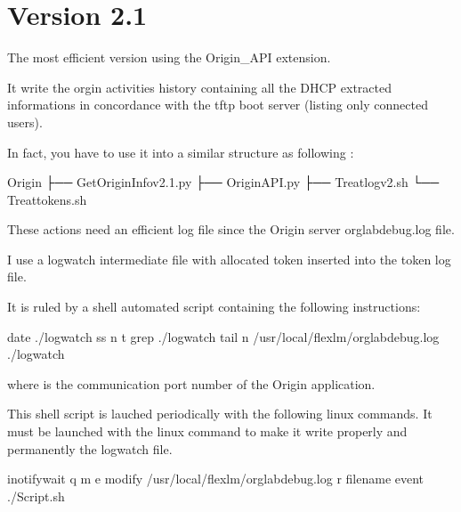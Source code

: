 \documentclass[letterpaper,10pt,english]{sphinxmanual}
\begin{document}
\newpage
\section{Version 2.1}
\label{\detokenize{Get_Origin_Info:version-2-1}}
\sphinxAtStartPar
The most efficient version using the Origin\_API extension.

\sphinxAtStartPar
It write the orgin activities history containing all the DHCP extracted informations in concordance with the tftp boot server (listing only  connected users).

\sphinxAtStartPar
In fact, you have to use it into a similar structure as following :

\begin{sphinxVerbatim}[commandchars=\\\{\}]
Origin
├── Get\PYGZus{}Origin\PYGZus{}Info\PYGZus{}v2.1.py
├── Origin\PYGZus{}API.py
├── Treat\PYGZus{}log\PYGZus{}v2.sh
└── Treat\PYGZus{}tokens.sh
\end{sphinxVerbatim}

\sphinxAtStartPar
These actions need an efficient log file since the Origin server orglabdebug.log file.

\sphinxAtStartPar
I use a logwatch intermediate file with allocated token inserted into the token log file.

\sphinxAtStartPar
It is ruled by a shell automated script containing the following instructions:

\begin{sphinxVerbatim}[commandchars=\\\{\}]
date \PYGZgt{}\PYGZgt{} ./logwatch
ss \PYGZhy{}n \PYGZhy{}t  grep  \PYGZgt{}\PYGZgt{} ./logwatch
tail \PYGZhy{}n  /usr/local/flexlm/orglabdebug.log \PYGZgt{}\PYGZgt{} ./logwatch
\end{sphinxVerbatim}

\sphinxAtStartPar
where  is the communication port number of the Origin application.

\sphinxAtStartPar
This shell script is lauched periodically with the following linux commands.
It must be launched with the  linux command to make it write properly and permanently the logwatch file.

\begin{sphinxVerbatim}[commandchars=\\\{\}]
inotifywait \PYGZhy{}q \PYGZhy{}m \PYGZhy{}e modify /usr/local/flexlm/orglabdebug.log
  \PYGZhy{}r filename event 
 ./Script.sh
\end{sphinxVerbatim}
\end{document}
